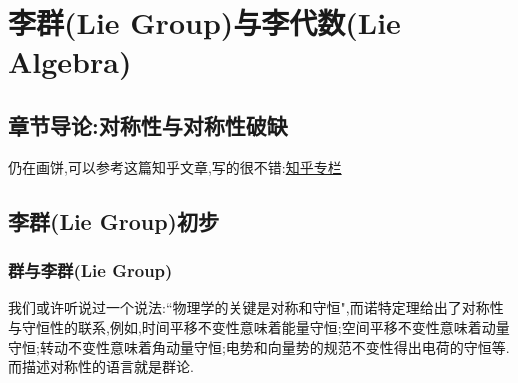 \setchapterpreamble[u]{\margintoc}
\chapter{李群(Lie Group)与李代数(Lie Algebra)}


\section*{章节导论:对称性与对称性破缺}
仍在画饼,可以参考这篇知乎文章,写的很不错:\href{https://zhuanlan.zhihu.com/p/338221764}{知乎专栏}




\section{李群(Lie Group)初步}
\subsection{群与李群(Lie Group)}
我们或许听说过一个说法:``物理学的关键是对称和守恒",而诺特定理给出了对称性与守恒性的联系,例如,时间平移不变性意味着能量守恒;空间平移不变性意味着动量守恒;转动不变性意味着角动量守恒;电势和向量势的规范不变性得出电荷的守恒等.而描述对称性的语言就是群论.


